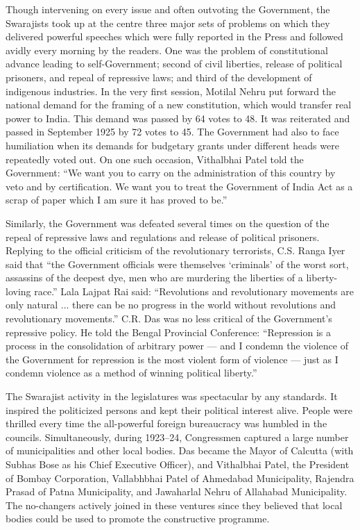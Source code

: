 \begin{multicols}{2}
Though intervening on every issue and often outvoting the Government, the Swarajists took up at the centre three major sets of problems on which they delivered powerful speeches which were fully reported in the Press and followed avidly every morning by the readers. One was the problem of constitutional advance leading to self-Government; second of civil liberties, release of political prisoners, and repeal of repressive laws; and third of the development of indigenous industries. In the very first session, Motilal Nehru put forward the national demand for the framing of a new constitution, which would transfer real power to India. This demand was passed by 64 votes to 48. It was reiterated and passed in September 1925 by 72 votes to 45. The Government had also to face humiliation when its demands for budgetary grants under different heads were repeatedly voted out. On one such occasion, Vithalbhai Patel told the Government: ``We want you to carry on the administration of this country by veto and by certification. We want you to treat the Government of India Act as a scrap of paper which I am sure it has proved to be.''

Similarly, the Government was defeated several times on the question of the repeal of repressive laws and regulations and release of political prisoners. Replying to the official criticism of the revolutionary terrorists, C.S. Ranga Iyer said that ``the Government officials were themselves `criminals' of the worst sort, assassins of the deepest dye, men who are murdering the liberties of a liberty-loving race.'' Lala Lajpat Rai said: ``Revolutions and revolutionary movements are only natural ... there can be no progress in the world without revolutions and revolutionary movements.'' C.R. Das was no less critical of the Government's repressive policy. He told the Bengal Provincial Conference: ``Repression is a process in the consolidation of arbitrary power --- and I condemn the violence of the Government for repression is the most violent form of violence --- just as I condemn violence as a method of winning political liberty.''

The Swarajist activity in the legislatures was spectacular by any standards. It inspired the politicized persons and kept their political interest alive. People were thrilled every time the all-powerful foreign bureaucracy was humbled in the councils. Simultaneously, during 1923--24, Congressmen captured a large number of municipalities and other local bodies. Das became the Mayor of Calcutta (with Subhas Bose as his Chief Executive Officer), and Vithalbhai Patel, the President of Bombay Corporation, Vallabhbhai Patel of Ahmedabad Municipality, Rajendra Prasad of Patna Municipality, and Jawaharlal Nehru of Allahabad Municipality. The no-changers actively joined in these ventures since they believed that local bodies could be used to promote the constructive programme.


\end{multicols}
